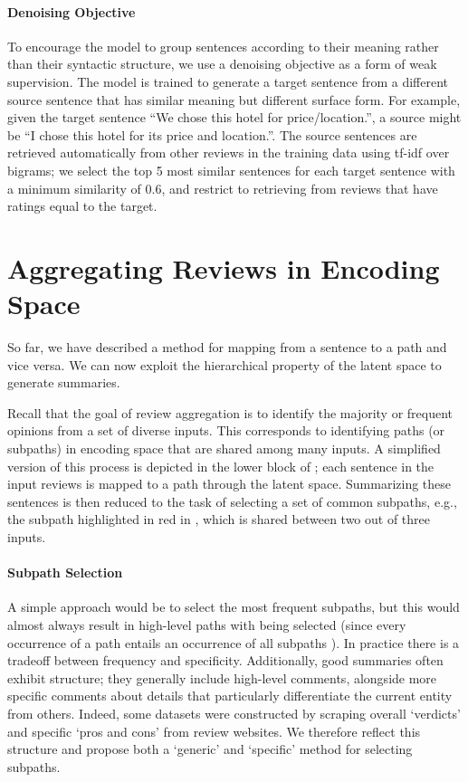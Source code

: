 \documentclass[11pt]{article}
\begin{document}
\paragraph{Denoising Objective} To encourage the model to group sentences according to their meaning rather than their syntactic structure, we use a denoising objective as a form of weak supervision. The model is trained to generate a target sentence from a different source sentence that has similar meaning but different surface form. For example, given the target sentence ``We chose this hotel for price/location.'',   a source might be ``I chose this hotel for its price and location.''. The source sentences are retrieved automatically from other reviews in the training data using tf-idf \cite{tfidf} over bigrams; we select the top 5 most similar sentences for each target sentence with a minimum similarity of 0.6, and restrict to retrieving from reviews that have ratings equal to the target. 



\section{Aggregating Reviews in Encoding Space}
\label{sec:opagg}
\vspace{-.1cm}
So far, we have described a method for mapping from a sentence  to a path  and vice versa. We can now exploit the hierarchical property of the latent space to generate summaries.

Recall that the goal of review aggregation is to identify the majority or frequent opinions from a set of diverse inputs. This corresponds to identifying paths (or subpaths) in encoding space that are shared among many inputs. A simplified version of this process is depicted in the lower block of ; each sentence  in the input reviews is mapped to a path  through the latent space. Summarizing these sentences is then reduced to the task of selecting a set of common subpaths, e.g., the subpath highlighted in red in , which is shared between two out of three inputs.

\paragraph{Subpath Selection}
\label{sec:summ_construction}

A simple approach would be to select the most frequent subpaths, but this would almost always result in high-level paths with  being selected (since every occurrence of a path  entails an occurrence of all subpaths ). In practice there is a tradeoff between frequency and specificity. Additionally, good summaries often exhibit structure; they generally include high-level comments, alongside more specific comments about details that particularly differentiate the current entity from others. Indeed, some datasets \cite[e.g., AmaSum,][]{brazinskas-etal-2021-learning} were constructed by scraping overall `verdicts' and specific `pros and cons' from review websites. We therefore reflect this structure and propose both a `generic' and `specific' method for selecting subpaths.
\end{document}
